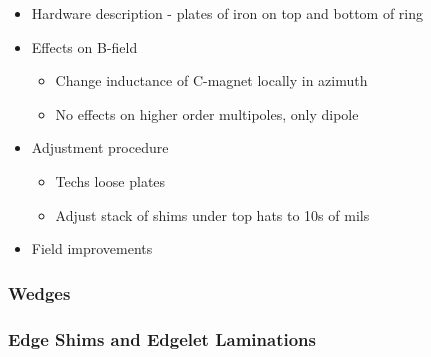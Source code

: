 \begin{itemize}
  \item Hardware description - plates of iron on top and bottom of ring
  \item Effects on B-field
    \begin{itemize}
      \item Change inductance of C-magnet locally in azimuth
      \item No effects on higher order multipoles, only dipole
    \end{itemize}
  \item Adjustment procedure
    \begin{itemize}
      \item Techs loose plates
      \item Adjust stack of shims under top hats to 10s of mils
    \end{itemize}
  \item Field improvements
\end{itemize}

\subsubsection{Wedges}

\subsubsection{Edge Shims and Edgelet Laminations}

